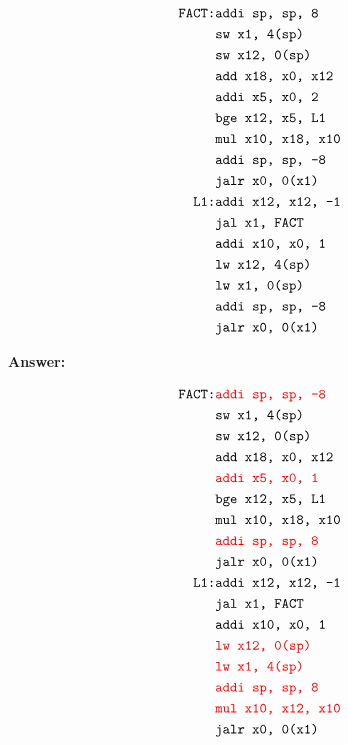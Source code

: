\documentclass[11pt,a4paper]{article}
\begin{document}
$$
\begin{aligned}
\verb|FACT:| & \verb|addi sp, sp, 8| \\
&\verb|sw x1, 4(sp)| \\
&\verb|sw x12, 0(sp)| \\
&\verb|add x18, x0, x12| \\
&\verb|addi x5, x0, 2| \\
&\verb|bge x12, x5, L1| \\
&\verb|mul x10, x18, x10| \\
&\verb|addi sp, sp, -8| \\
&\verb|jalr x0, 0(x1)| \\
\verb|L1:| & \verb|addi x12, x12, -1| \\
&\verb|jal x1, FACT| \\
&\verb|addi x10, x0, 1| \\
&\verb|lw x12, 4(sp)| \\
&\verb|lw x1, 0(sp)| \\
&\verb|addi sp, sp, -8| \\
&\verb|jalr x0, 0(x1)| \\
\end{aligned}
$$


\vspace{0.3cm}

\textbf{Answer:}

$$
\begin{aligned}
\verb|FACT:| & {\color{red}\verb|addi sp, sp, -8|} \\
&\verb|sw x1, 4(sp)| \\
&\verb|sw x12, 0(sp)| \\
&\verb|add x18, x0, x12| \\
&{\color{red}\verb|addi x5, x0, 1|} \\
&\verb|bge x12, x5, L1| \\
&\verb|mul x10, x18, x10| \\
&{\color{red}\verb|addi sp, sp, 8|} \\
&\verb|jalr x0, 0(x1)| \\
\verb|L1:| & \verb|addi x12, x12, -1| \\
&\verb|jal x1, FACT| \\
&\verb|addi x10, x0, 1| \\
&{\color{red}\verb|lw x12, 0(sp)|} \\
&{\color{red}\verb|lw x1, 4(sp)|} \\
&{\color{red}\verb|addi sp, sp, 8|} \\
&{\color{red}\verb|mul x10, x12, x10|} \\
&\verb|jalr x0, 0(x1)| \\
\end{aligned}
$$
\end{document}
